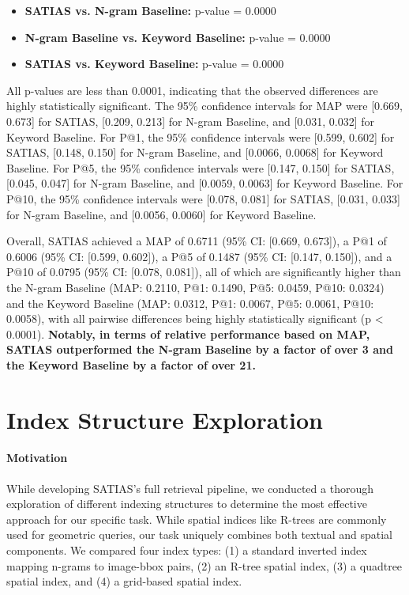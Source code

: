 \documentclass[manuscript,screen]{acmart}
\begin{document}
\begin{itemize}
    \item \textbf{SATIAS vs. N-gram Baseline:} p-value = 0.0000
    \item \textbf{N-gram Baseline vs. Keyword Baseline:} p-value = 0.0000
    \item \textbf{SATIAS vs. Keyword Baseline:} p-value = 0.0000
\end{itemize}

All p-values are less than 0.0001, indicating that the observed differences are highly statistically significant. The 95\% confidence intervals for MAP were [0.669, 0.673] for SATIAS, [0.209, 0.213] for N-gram Baseline, and [0.031, 0.032] for Keyword Baseline. For P@1, the 95\% confidence intervals were [0.599, 0.602] for SATIAS, [0.148, 0.150] for N-gram Baseline, and [0.0066, 0.0068] for Keyword Baseline. For P@5, the 95\% confidence intervals were [0.147, 0.150] for SATIAS, [0.045, 0.047] for N-gram Baseline, and [0.0059, 0.0063] for Keyword Baseline. For P@10, the 95\% confidence intervals were [0.078, 0.081] for SATIAS, [0.031, 0.033] for N-gram Baseline, and [0.0056, 0.0060] for Keyword Baseline.

Overall, SATIAS achieved a MAP of 0.6711 (95\% CI: [0.669, 0.673]), a P@1 of 0.6006 (95\% CI: [0.599, 0.602]), a P@5 of 0.1487 (95\% CI: [0.147, 0.150]), and a P@10 of 0.0795 (95\% CI: [0.078, 0.081]), all of which are significantly higher than the N-gram Baseline (MAP: 0.2110, P@1: 0.1490, P@5: 0.0459, P@10: 0.0324) and the Keyword Baseline (MAP: 0.0312, P@1: 0.0067, P@5: 0.0061, P@10: 0.0058), with all pairwise differences being highly statistically significant (p < 0.0001).
\textbf{Notably, in terms of relative performance based on MAP, SATIAS outperformed the N-gram Baseline by a factor of over 3 and the Keyword Baseline by a factor of over 21.}

\section{Index Structure Exploration}
\label{sec:index_exploration}

\paragraph{Motivation} While developing SATIAS's full retrieval pipeline, we conducted a thorough exploration of different indexing structures to determine the most effective approach for our specific task. While spatial indices like R-trees are commonly used for geometric queries, our task uniquely combines both textual and spatial components. We compared four index types: (1) a standard inverted index mapping n-grams to image-bbox pairs, (2) an R-tree spatial index, (3) a quadtree spatial index, and (4) a grid-based spatial index.
\end{document}
